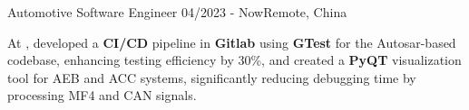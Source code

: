 \resumeSubheadingReza
{Automotive Software Engineer}{}
{04/2023 - Now}{Remote, China}
{
  At , developed a \textbf{CI/CD} pipeline in \textbf{Gitlab} using \textbf{GTest} for the Autosar-based codebase, enhancing testing efficiency by 30\%, and created a \textbf{PyQT} visualization tool for AEB and ACC systems, significantly reducing debugging time by processing MF4 and CAN signals.

}




